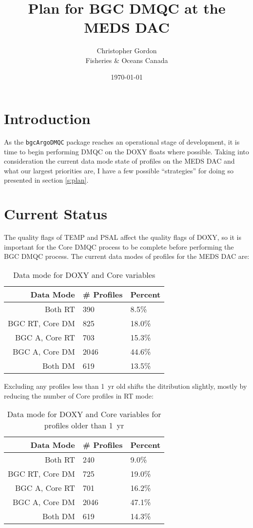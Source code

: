 \documentclass[11pt,english]{article} %
\title{Plan for BGC DMQC at the MEDS DAC}
\author{Christopher Gordon\\Fisheries \& Oceans Canada}
\date{\today}
\begin{document}
\maketitle

\section{Introduction}

As the \verb|bgcArgoDMQC| package reaches an operational stage of development,
it is time to begin performing DMQC on the DOXY floats where possible. Taking
into consideration the current data mode state of profiles on the MEDS DAC and
what our largest priorities are, I have a few possible ``strategies'' for doing
so presented in section \ref{s:plan}.

\section{Current Status}

The quality flags of TEMP and PSAL affect the quality flags of DOXY, so it is 
important for the Core DMQC process to be complete before performing the BGC
DMQC process. The current data modes of profiles for the MEDS DAC are:

\begin{table}[H]
    \centering
    \caption{Data mode for DOXY and Core variables}
    \begin{tabular}{r|ll}
        \hline
        Data Mode & \# Profiles & Percent \\
        \hline\hline
        Both RT & 390 & 8.5\% \\
        BGC RT, Core DM & 825 & 18.0\% \\
        BGC A, Core RT & 703 & 15.3\% \\
        BGC A, Core DM & 2046 & 44.6\% \\
        Both DM & 619 & 13.5\% \\
        \hline
    \end{tabular}
\end{table}

Excluding any profiles less than 1~yr old shifts the ditribution slightly, 
mostly by reducing the number of Core profiles in RT mode: 

\begin{table}[H]
    \centering
    \caption{Data mode for DOXY and Core variables for profiles older than 1~yr}
    \begin{tabular}{r|ll}
        \hline
        Data Mode & \# Profiles & Percent \\
        \hline\hline
        Both RT & 240 & 9.0\% \\
        BGC RT, Core DM & 725 & 19.0\% \\
        BGC A, Core RT & 701 & 16.2\% \\
        BGC A, Core DM & 2046 & 47.1\% \\
        Both DM & 619 & 14.3\% \\
        \hline
    \end{tabular}
\end{table}
\end{document}
